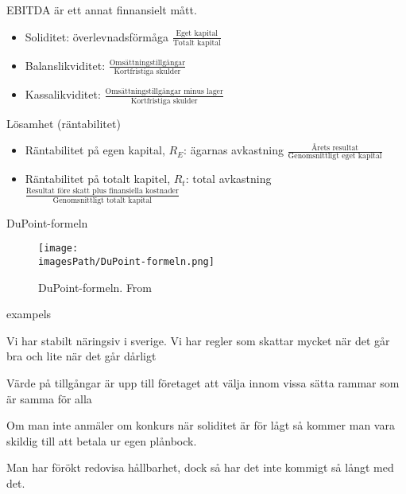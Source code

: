 EBITDA är ett annat finnansielt mått.

\begin{itemize} %
    \item Soliditet: överlevnadsförmåga \newline
    $\frac{\text{Eget kapital}}{\text{Totalt kapital}}$
    \item Balanslikviditet: \newline 
    $\frac{\text{Omsättningstillgångar}}{\text{Kortfristiga skulder}}$
    \item Kassalikviditet: \newline
    $\frac{\text{Omsättningstillgångar minus lager}}{\text{Kortfristiga skulder}}$
\end{itemize}

Lösamhet (räntabilitet)
\begin{itemize}
    \item Räntabilitet på egen kapital, $R_E$: ägarnas avkastning \newline
    $\frac{\text{Årets resultat}}{\text{Genomsnittligt eget kapital}}$
    \item Räntabilitet på totalt kapitel, $R_t$: total avkastning \newline
    $\frac{\text{Resultat före skatt plus finansiella kostnader}}{\text{Genomsnittligt totalt kapital}}$
\end{itemize}

DuPoint-formeln
\begin{figure}[H]
    \centering
    \texttt{[image: \\imagesPath/DuPoint-formeln.png]}
    \caption{DuPoint-formeln. From \cite{im}}
\end{figure}

exampels %


Vi har stabilt näringsiv i sverige. Vi har regler som skattar mycket när det går bra 
och lite när det går dårligt 

Värde på tillgångar är upp till företaget att välja innom vissa sätta rammar som är samma för alla

Om man inte anmäler om konkurs när soliditet är för lågt så kommer man vara skildig till 
att betala ur egen plånbock. 


Man har förökt redovisa hållbarhet, dock så har det inte kommigt så långt med det.


